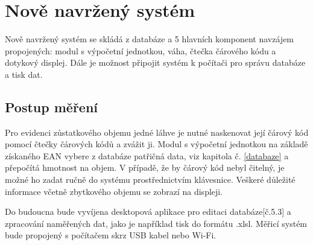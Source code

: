 \chapter{Nově navržený systém}
\label{Nově navržený systém}
Nově navržený systém se skládá z databáze a 5 hlavních komponent navzájem propojených: modul s výpočetní jednotkou, váha, čtečka čárového kódu a dotykový displej. Dále je možnost připojit systém k počítači pro správu databáze a tisk dat. 

\section{Postup měření}%
Pro evidenci zůstatkového objemu jedné láhve je nutné naskenovat její čárový kód pomocí čtečky čárových kódů a zvážit ji. Modul s výpočetní jednotkou na základě získaného EAN vybere z databáze patřičná data, viz kapitola č. \ref{databaze} a přepočítá hmotnost na objem. V případě, že by čárový kód nebyl čitelný, je možné ho zadat ručně do systému prostřednictvím klávesnice. Veškeré důležité informace včetně zbytkového objemu se zobrazí na displeji. %

Do budoucna bude vyvíjena desktopová aplikace pro editaci databáze[č.5.3] a zpracování naměřených dat, jako je například tisk do formátu .xlsl. Měřicí systém bude propojený s počítačem skrz USB kabel nebo Wi-Fi.


